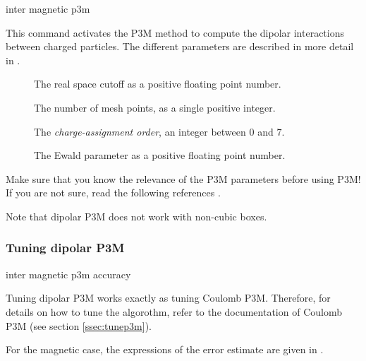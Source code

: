 \begin{essyntax}
  inter magnetic  p3m 
     
  \begin{features}
  \end{features}
\end{essyntax}

This command activates the P3M method to compute the dipolar
interactions between charged particles.  The different parameters are
described in more detail in \cite{cerda08a}.
\begin{description}
\item[] The real space cutoff as a positive
  floating point number.
\item[] The number of mesh points, as a single positive
  integer.
\item[] The \emph{charge-assignment order}, an integer
  between $0$ and $7$.
\item[] The Ewald parameter as a positive floating point
  number.
\end{description}

Make sure that you know the relevance of the P3M parameters before
using P3M! If you are not sure, read the following references
\cite{ewald21, hockney88, kolafa92, deserno98, deserno98a, deserno00,
  deserno00a}.

Note that dipolar P3M does not work with non-cubic boxes.

\subsubsection{Tuning dipolar P3M}
\begin{essyntax}
  inter magnetic  p3m 
  accuracy \\
     
  \begin{features}
  \end{features}
\end{essyntax}

Tuning dipolar P3M works exactly as tuning Coulomb P3M.  Therefore,
for details on how to tune the algorothm, refer to the documentation
of Coulomb P3M (see section \vref{ssec:tunep3m}).

For the magnetic case, the expressions of the error estimate are given
in \cite{cerda08a}.

